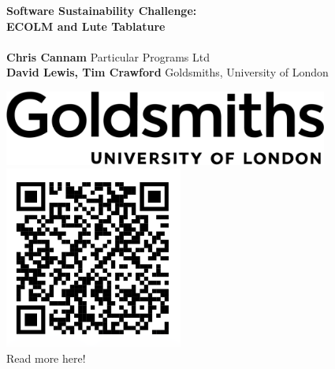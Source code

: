 \documentclass[a0,portrait]{a0poster}
\begin{document}
\begin{minipage}[b]{0.8\linewidth}
  \vspace{2cm}
  \veryHuge \textbf{Software Sustainability Challenge:\\
    ECOLM and Lute Tablature}\\
  \huge
  \\
  \textbf{Chris Cannam} Particular Programs Ltd\\
\textbf{David Lewis, Tim Crawford} Goldsmiths, University of London\\
\end{minipage}
%
\begin{minipage}[b]{0.2\linewidth}
  \begin{flushright}
    \includegraphics[width=0.8\textwidth]{images/goldsmiths-trimmed}\\
    \vspace{1cm}
    \includegraphics[height=6cm]{images/qr}\\
    \vspace{-5mm}
    Read more here!
  \end{flushright}
  \vspace{2cm}
\end{minipage}

\vspace{3cm} %

\end{document}
